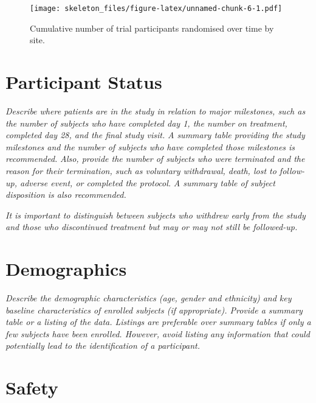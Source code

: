 \documentclass[
  11pt,
]{article}
\begin{document}
\begin{figure}
\centering
\texttt{[image: skeleton\_files/figure-latex/unnamed-chunk-6-1.pdf]}
\caption{\label{fig:unnamed-chunk-6}Cumulative number of trial participants randomised over time by site.}
\end{figure}

\clearpage

\hypertarget{participant-status}{%
\section{Participant Status}\label{participant-status}}

\emph{Describe where patients are in the study in relation to major milestones, such as the number of subjects who have completed day 1, the number on treatment, completed day 28, and the final study visit.}
\emph{A summary table providing the study milestones and the number of subjects who have completed those milestones is recommended.}
\emph{Also, provide the number of subjects who were terminated and the reason for their termination, such as voluntary withdrawal, death, lost to follow-up, adverse event, or completed the protocol.}
\emph{A summary table of subject disposition is also recommended.}

\emph{It is important to distinguish between subjects who withdrew early from the study and those who discontinued treatment but may or may not still be followed-up.}

\clearpage

\hypertarget{demographics}{%
\section{Demographics}\label{demographics}}

\emph{Describe the demographic characteristics (age, gender and ethnicity) and key baseline characteristics of enrolled subjects (if appropriate). Provide a summary table or a listing of the data. Listings are preferable over summary tables if only a few subjects have been enrolled. However, avoid listing any information that could potentially lead to the identification of a participant.}

\clearpage

\hypertarget{safety}{%
\section{Safety}\label{safety}}
\end{document}
